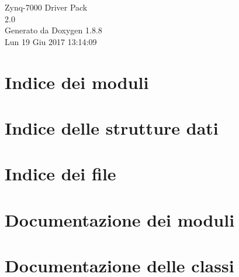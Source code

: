 \documentclass[twoside]{book}
\newcommand{\+}{\discretionary{\mbox{\scriptsize$\hookleftarrow$}}{}{}}
\newcommand{\clearemptydoublepage}{%
  \newpage{\pagestyle{empty}\cleardoublepage}%
}
\begin{document}
\hypersetup{pageanchor=false,
             bookmarks=true,
             bookmarksnumbered=true,
             pdfencoding=unicode
            }
\begin{titlepage}
\vspace*{7cm}
\begin{center}%
{\Large Zynq-\/7000 Driver Pack \\[1ex]\large 2.\+0 }\\
\vspace*{1cm}
{\large Generato da Doxygen 1.8.8}\\
\vspace*{0.5cm}
{\small Lun 19 Giu 2017 13:14:09}\\
\end{center}
\end{titlepage}
\clearemptydoublepage
\tableofcontents
\clearemptydoublepage
{}
\hypersetup{pageanchor=true}

\chapter{Indice dei moduli}

\chapter{Indice delle strutture dati}

\chapter{Indice dei file}

\chapter{Documentazione dei moduli}















\chapter{Documentazione delle classi}







\end{document}
